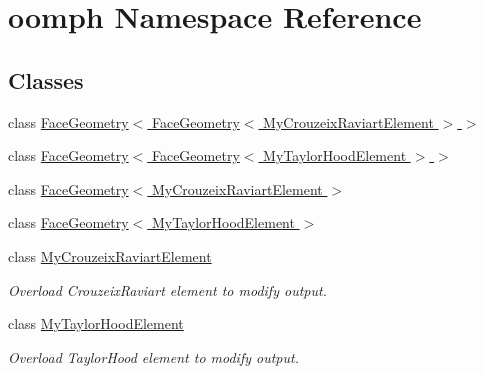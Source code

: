 \hypertarget{namespaceoomph}{}\section{oomph Namespace Reference}
\label{namespaceoomph}
\subsection*{Classes}
\begin{DoxyCompactItemize}
\item 
class \hyperlink{classoomph_1_1FaceGeometry_3_01FaceGeometry_3_01MyCrouzeixRaviartElement_01_4_01_4}{Face\+Geometry$<$ Face\+Geometry$<$ My\+Crouzeix\+Raviart\+Element $>$ $>$}
\item 
class \hyperlink{classoomph_1_1FaceGeometry_3_01FaceGeometry_3_01MyTaylorHoodElement_01_4_01_4}{Face\+Geometry$<$ Face\+Geometry$<$ My\+Taylor\+Hood\+Element $>$ $>$}
\item 
class \hyperlink{classoomph_1_1FaceGeometry_3_01MyCrouzeixRaviartElement_01_4}{Face\+Geometry$<$ My\+Crouzeix\+Raviart\+Element $>$}
\item 
class \hyperlink{classoomph_1_1FaceGeometry_3_01MyTaylorHoodElement_01_4}{Face\+Geometry$<$ My\+Taylor\+Hood\+Element $>$}
\item 
class \hyperlink{classoomph_1_1MyCrouzeixRaviartElement}{My\+Crouzeix\+Raviart\+Element}
\begin{DoxyCompactList}\small\item\em Overload Crouzeix\+Raviart element to modify output. \end{DoxyCompactList}\item 
class \hyperlink{classoomph_1_1MyTaylorHoodElement}{My\+Taylor\+Hood\+Element}
\begin{DoxyCompactList}\small\item\em Overload Taylor\+Hood element to modify output. \end{DoxyCompactList}\end{DoxyCompactItemize}
